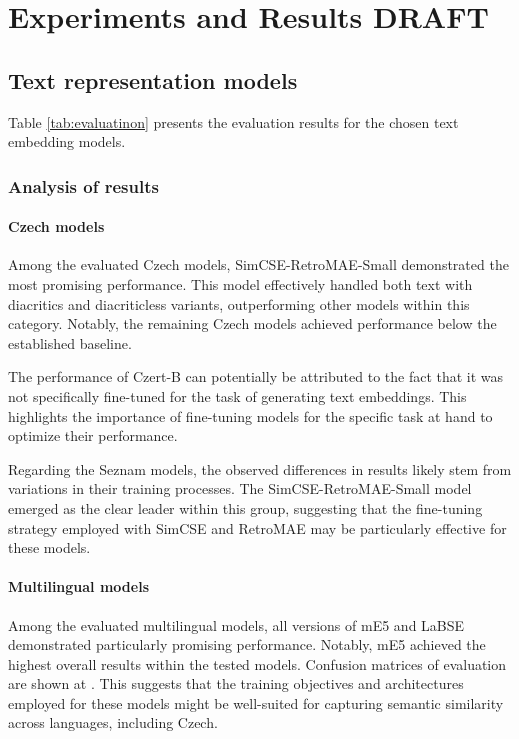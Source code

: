 
\chapter{Experiments and Results DRAFT\label{chap:experiments_and_results}}

\section{Text representation models}
Table \ref{tab:evaluatinon} presents the evaluation results for the chosen text embedding models.

\subsection{Analysis of results}
\subsubsection{Czech models}
Among the evaluated Czech models, SimCSE-RetroMAE-Small demonstrated the most promising performance.
This model effectively handled both text with diacritics and diacriticless variants, outperforming other models within this category.
Notably, the remaining Czech models achieved performance below the established baseline.

The performance of Czert-B can potentially be attributed to the fact that it was not specifically fine-tuned for the task of generating text embeddings.
This highlights the importance of fine-tuning models for the specific task at hand to optimize their performance.

Regarding the Seznam models, the observed differences in results likely stem from variations in their training processes.
The SimCSE-RetroMAE-Small model emerged as the clear leader within this group, suggesting that the fine-tuning strategy employed with \ac{SimCSE} and \ac{RetroMAE} may be particularly effective for these models.

\subsubsection{Multilingual models}
Among the evaluated multilingual models, all versions of mE5 and LaBSE demonstrated particularly promising performance.
Notably, mE5 achieved the highest overall results within the tested models.
Confusion matrices of evaluation are shown at .
This suggests that the training objectives and architectures employed for these models might be well-suited for capturing semantic similarity across languages, including Czech.


